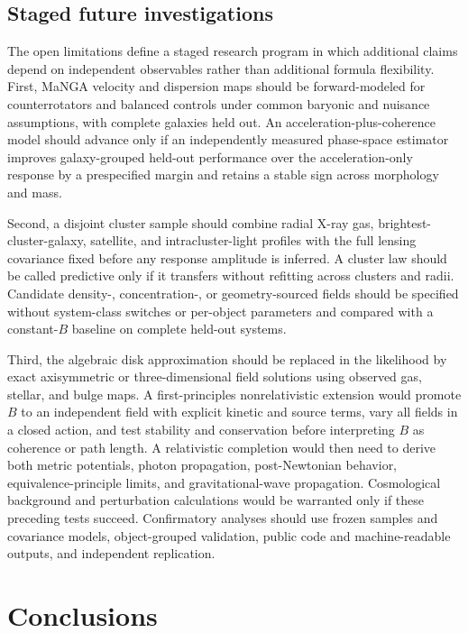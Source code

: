 \documentclass[utf8]{FrontiersinHarvard}
\begin{document}
\subsection{Staged future investigations}\label{staged-future-investigations}

The open limitations define a staged research program in which additional claims depend on independent observables rather than additional formula flexibility. First, MaNGA velocity and dispersion maps should be forward-modeled for counterrotators and balanced controls under common baryonic and nuisance assumptions, with complete galaxies held out. An acceleration-plus-coherence model should advance only if an independently measured phase-space estimator improves galaxy-grouped held-out performance over the acceleration-only response by a prespecified margin and retains a stable sign across morphology and mass.

Second, a disjoint cluster sample should combine radial X-ray gas, brightest-cluster-galaxy, satellite, and intracluster-light profiles with the full lensing covariance fixed before any response amplitude is inferred. A cluster law should be called predictive only if it transfers without refitting across clusters and radii. Candidate density-, concentration-, or geometry-sourced fields should be specified without system-class switches or per-object parameters and compared with a constant-\(B\) baseline on complete held-out systems.

Third, the algebraic disk approximation should be replaced in the likelihood by exact axisymmetric or three-dimensional field solutions using observed gas, stellar, and bulge maps. A first-principles nonrelativistic extension would promote \(B\) to an independent field with explicit kinetic and source terms, vary all fields in a closed action, and test stability and conservation before interpreting \(B\) as coherence or path length. A relativistic completion would then need to derive both metric potentials, photon propagation, post-Newtonian behavior, equivalence-principle limits, and gravitational-wave propagation. Cosmological background and perturbation calculations would be warranted only if these preceding tests succeed. Confirmatory analyses should use frozen samples and covariance models, object-grouped validation, public code and machine-readable outputs, and independent replication.

\section{Conclusions}\label{conclusions}
\end{document}
